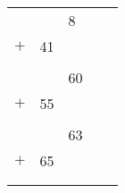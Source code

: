 \documentclass{article}
\begin{document}
\begin{tabularx}{\textwidth}{XXXXX}
	&\begin{tabular}{lS}
		&8 \\
		$+$&41 \\
		\hline 
		& \\
	\end{tabular}

	&\begin{tabular}{lS}
		&60 \\
		$+$&55 \\
		\hline 
		& \\
	\end{tabular}

	&\begin{tabular}{lS}
		&63 \\
		$+$&65 \\
		\hline 
		& \\
	\end{tabular}
\end{tabularx}
\end{document}
